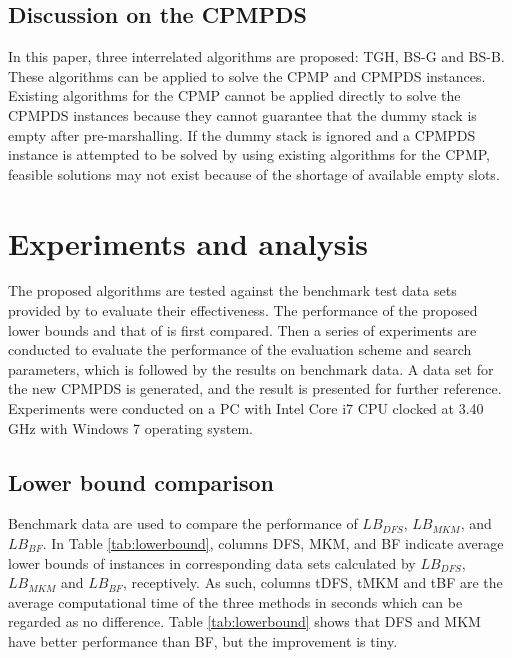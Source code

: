 \documentclass[review,3p,times,authoryear,12pt]{elsarticle}
\begin{document}
\subsection{Discussion on the CPMPDS}

In this paper, three interrelated algorithms are proposed: TGH, BS-G and BS-B.
These algorithms can be applied to solve the CPMP and CPMPDS instances. Existing algorithms for the CPMP cannot be applied directly to solve the CPMPDS instances because they cannot guarantee that the dummy stack is empty after pre-marshalling.
If the dummy stack is ignored and a CPMPDS instance is attempted to be solved by using existing algorithms for the CPMP, feasible solutions may not exist because of the shortage of available empty slots.

\section{Experiments and analysis}
\label{sec:ce}

The proposed algorithms are tested against the benchmark test data sets provided by \cite{BF2012} to evaluate their effectiveness.
The performance of the proposed lower bounds and that of \cite{BF2012} is first compared. Then a series of experiments are conducted to evaluate the performance of the evaluation scheme and search parameters, which is followed by the results on benchmark data.
A data set for the new CPMPDS is generated, and the result is presented for further reference.
Experiments were conducted on a PC with Intel Core i7 CPU clocked at 3.40 GHz with Windows 7 operating system.

\subsection {Lower bound comparison}

Benchmark data are used to compare the performance of $\mathit{LB}_\mathit{DFS}$, $\mathit{LB}_\mathit{MKM}$, and $\mathit{LB}_\mathit{BF}$.
In Table \ref{tab:lowerbound}, columns DFS, MKM, and BF indicate average lower bounds of instances in corresponding data sets calculated by $\mathit{LB}_\mathit{DFS}$, $\mathit{LB}_\mathit{MKM}$ and $\mathit{LB}_\mathit{BF}$, receptively.
As such, columns tDFS, tMKM and tBF are the average computational time of the three methods in seconds which can be regarded as no difference.
Table \ref{tab:lowerbound} shows that DFS and MKM have better performance than BF, but the improvement is tiny.
\end{document}
